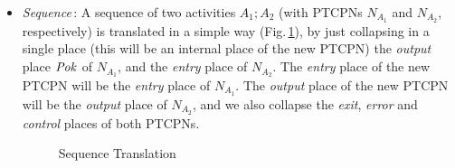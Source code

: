 \begin{itemize}

\item {\it Sequence}\,: A sequence of two activities $A_1;A_2$ (with PTCPNs $N_{A_1}$ and
      $N_{A_2}$, respectively)
      is translated in a simple
      way (Fig.\,\ref{seq}), by just collapsing in a 
      single place (this will be
      an internal place of the new PTCPN)
      the {\it output} place ${\it Pok}$ of $N_{A_1}$, and the
      {\it entry} place of $N_{A_2}$.  The {\it entry} place
      of the new PTCPN will
      be the {\it entry} place of $N_{A_1}$. The
      {\it output} place of the new PTCPN will
      be the {\it output} place of  $N_{A_2}$, and we also
      collapse the {\it exit}, {\it error} and {\it control}  places of both PTCPNs.


\begin{figure}[!ht]
\begin{center}
\end{center}
\caption{\label{seq} Sequence Translation}
\end{figure}


\end{itemize}
